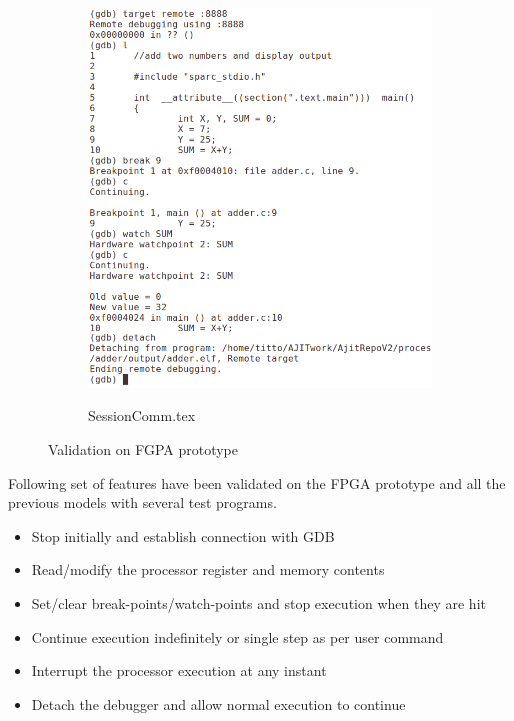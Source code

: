 \begin{figure}[H]
	\centering
	\begin{subfigure}{\textwidth}
		\centering
		\includegraphics[width=0.8\columnwidth]{Figs/Screenshot/screen.png}
	\end{subfigure}
\end{figure}

\vspace*{4cm}

\begin{figure}[H]
	\ContinuedFloat 	
	\begin{subfigure}{\textwidth}
		\centering
		\def\svgwidth{0.5\columnwidth}
		{SessionComm.tex}
	\end{subfigure}

	\caption{Validation on FGPA prototype}
	\label{GDBsession}
\end{figure}

Following set of features have been validated on the FPGA prototype and all the previous models with several test programs.
\begin{itemize}
	\item Stop initially and establish connection with GDB
	\item Read/modify the processor register and memory contents
	\item Set/clear break-points/watch-points and stop execution when they are hit
	\item Continue execution indefinitely or single step as per user command
	\item Interrupt the processor execution at any instant 
	\item Detach the debugger and allow normal execution to continue
\end{itemize}